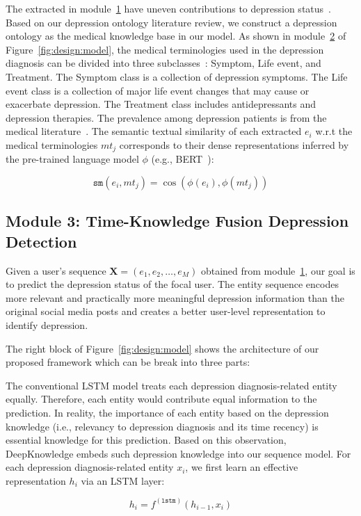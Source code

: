 The \entity extracted in module~\hyperref[sec:design:module1]{1} have uneven contributions to depression status~. Based on our depression ontology literature review, we construct a depression ontology as the medical knowledge base in our model. As shown in module~\hyperref[sec:design:module2]{2} of Figure~\ref{fig:design:model}, the medical terminologies used in the depression diagnosis can be divided into three subclasses~\citep{apa_diagnostic_2013,beck_depression_2014,almqvist_impact_2008}: Symptom, Life event, and Treatment. The Symptom class is a collection of depression symptoms. The Life event class is a collection of major life event changes that may cause or exacerbate depression. The Treatment class includes antidepressants and depression therapies.  The prevalence among depression patients is from the medical literature~\citep{beck_depression_2014}. The semantic textual similarity of each extracted \entity $e_i$ w.r.t the medical terminologies $mt_j$ corresponds to their dense representations inferred by the pre-trained language model $\phi$ (e.g., BERT~\citep{devlin_bert_2018}):

\begin{equation} \label{eq:cosine-similarity}
    \mathtt{sm}(e_i, mt_j) = \cos(\phi(e_i), \phi(mt_j))
\end{equation}

\subsection{Module 3: Time-Knowledge Fusion Depression Detection}\label{sec:design:module3}

Given a user's \entity sequence $\boldsymbol{X} = \left(e_1, e_2, \ldots, e_M\right)$ obtained from module~\hyperref[sec:design:module1]{1}, our goal is to predict the depression status of the focal user. The entity sequence encodes more relevant and practically more meaningful depression information than the original social media posts and creates a better user-level representation to identify depression. 

The right block of Figure~\ref{fig:design:model} shows the architecture of our proposed framework which can be break into three parts: 

The conventional LSTM model treats each depression diagnosis-related entity equally. Therefore, each entity would contribute equal information to the prediction. In reality, the importance of each entity based on the depression knowledge (i.e., relevancy to depression diagnosis and its time recency) is essential knowledge for this prediction. Based on this observation, DeepKnowledge embeds such depression knowledge into our sequence model. For each depression diagnosis-related entity $x_i$, we first learn an effective representation $h_i$ via an LSTM layer:

\begin{equation} \label{eq:lstm}
h_i = f^{(\mathtt{lstm})}\left(h_{i-1}, x_i\right)
\end{equation}
